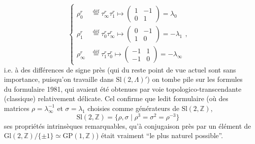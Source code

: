 \[
\left\{\begin{aligned}
\rho_0^r&\overset{\mathrm{déf}}{=}\tau_\infty^r\tau_1^r\mapsto\begin{pmatrix}1&-1\\0&1\end{pmatrix}=\lambda_0\\
\rho_1^r&\overset{\mathrm{déf}}{=}\tau_0^r\tau_\infty^r\mapsto\begin{pmatrix}0&-1\\1&0\end{pmatrix}=-\lambda_1\\
\rho_\infty^r&\overset{\mathrm{déf}}{=}\tau_1^r\tau_0^r\mapsto\begin{pmatrix}-1&1\\-1&0\end{pmatrix}=-\lambda_\infty
\end{aligned}\right.,\tag*{(83)}
\]
i.e. à des différences de signe près (qui du reste
point de vue actuel sont sans importance, puisqu'on travaille dans $\mathrm{Sl}(2,\Lambda)'$) on tombe pile sur les formules du formulaire 1981, qui avaient été obtenues par voie topologico-transcendante (classique) relativement délicate. Cel confirme que ledit formulaire (où  des matrices $\rho=\lambda_\infty^{-1}$ et $\sigma=\lambda_1$ choisies comme générateurs de $\mathrm{Sl}(2,\mathbb Z)$, 
\[
\mathrm{Sl}(2,\mathbb Z)=\{\rho,\sigma\mid\rho^3=\sigma^2=\rho^{-3}\}\tag*{(84)}
\]
 ses propriétés intrinsèques remarquables, qu'à conjugaison près par un élément de $\mathrm{Gl}(2,\mathbb Z)/\{\pm1\}\simeq\mathrm{GP}(1,\mathbb Z)$) était vraiment ``le plus naturel possible''.

